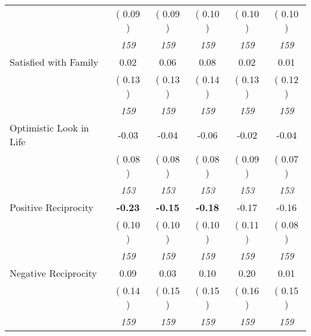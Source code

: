 \begin{tabular}{l c c c c c}
& (     0.09 ) & (     0.09 ) & (     0.10 ) & (     0.10 ) & (     0.10 ) \\
& \textit{ 159 } & \textit{ 159 } & \textit{ 159 } & \textit{ 159 } & \textit{ 159 } \\
Satisfied with Family &      0.02 &      0.06 &      0.08 &      0.02 &      0.01 \\
& (     0.13 ) & (     0.13 ) & (     0.14 ) & (     0.13 ) & (     0.12 ) \\
& \textit{ 159 } & \textit{ 159 } & \textit{ 159 } & \textit{ 159 } & \textit{ 159 } \\
Optimistic Look in Life &     -0.03 &     -0.04 &     -0.06 &     -0.02 &     -0.04 \\
& (     0.08 ) & (     0.08 ) & (     0.08 ) & (     0.09 ) & (     0.07 ) \\
& \textit{ 153 } & \textit{ 153 } & \textit{ 153 } & \textit{ 153 } & \textit{ 153 } \\
Positive Reciprocity & \textbf{     -0.23 } & \textbf{     -0.15 } & \textbf{     -0.18 } &     -0.17 &     -0.16 \\
& (     0.10 ) & (     0.10 ) & (     0.10 ) & (     0.11 ) & (     0.08 ) \\
& \textit{ 159 } & \textit{ 159 } & \textit{ 159 } & \textit{ 159 } & \textit{ 159 } \\
Negative Reciprocity &      0.09 &      0.03 &      0.10 &      0.20 &      0.01 \\
& (     0.14 ) & (     0.15 ) & (     0.15 ) & (     0.16 ) & (     0.15 ) \\
& \textit{ 159 } & \textit{ 159 } & \textit{ 159 } & \textit{ 159 } & \textit{ 159 } \\
\bottomrule
\end{tabular}

